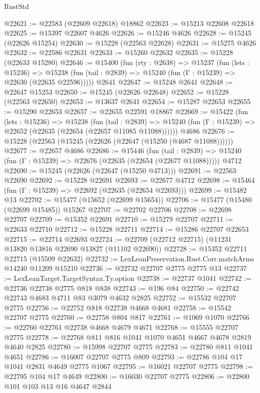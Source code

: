 \begin{lexlean}{RustStd}
\begin{coremodule}
@22621 := @22583 (@22609 @22618) @18862
@22623 := @15213 @22608 @22618
@22625 := @15397 @22607 @4626
@22626 := @15246 @4626
@22628 := @15245 (@22626 @15254)
@22630 := @15228 (@22563 @22628)
@22631 := @15275 @4626
@22632 := @22586 @22631
@22633 := @15260 @22632
@22635 := @15228 (@22633 @15280)
@22646 := @15400
    (fun (rty : @2638) =>
    @15237
      (fun (lets : @15236) =>
      @15238 (fun (tail : @2839) => @15240 (fun (Γ : @15239) => @22630 (@22635 @22596)))))
    @2641
@22647 := @15248 @2641
@22648 := @22647 @15253
@22650 := @15245 (@22626 @22648)
@22652 := @15228 (@22563 @22650)
@22653 := @13637 @2641
@22654 := @15287 @22653
@22655 := @15290 @22653
@22657 := @22655 @22591 @18867
@22669 := @15422
    (fun (lets : @15236) =>
    @15238
      (fun (tail : @2839) =>
      @15240 (fun (Γ : @15239) => @22652 (@22635 (@22654 (@22657 @11085 @11088))))))
    @4686
@22676 := @15228 (@22563 (@15245 (@22626 (@22647 (@15250 (@4687 @11088))))))
@22677 := @22657 @4686
@22686 := @15446
    (fun (tail : @2839) => @15240 (fun (Γ : @15239) => @22676 (@22635 (@22654 (@22677 @11088)))))
    @4712
@22690 := @15245 (@22626 (@22647 (@15250 @4713)))
@22691 := @22563 @22690
@22692 := @15228 @22691
@22693 := @22677 @4712
@22698 := @15464 (fun (Γ : @15239) => @22692 (@22635 (@22654 @22693)))
@22699 := @15482 @13
@22702 := @15477 (@15652 (@22699 @15654))
@22706 := @15477 (@15480 (@22699 @15485)) @15267
@22707 := @22702 @22706
@22708 := @22698 @22707
@22709 := @15352 @22691
@22710 := @15279 @22707
@22711 := @22633 @22710
@22712 := @15228 @22711
@22714 := @15286 @22707 @22653
@22715 := @22714 @22693
@22724 := @22709 (@22712 @22715) (@11231 @13820 @13816 @22690 @13827 (@11102 @22690))
@22728 := @15352 @22711 @22715 (@15509 @22632)
@22732 := LexLeanPreservation.Rust.Corr.matchArms @14240 @11209 @15210
@22736 := @22732 @22707 @2775 @2775 @13
@22737 := LexLeanTarget.TargetSyntax.Ty.option
@22738 := @22737 @1041
@22742 := @22736 @22738 @2775 @818 @838
@22743 := @196 @84
@22750 := @22742 @22743 @4683 @4711 @83 @3079 @4632 @2825
@22752 := @15532 @22707 @2775
@22756 := @22752 @818 @22738 @4668 @4681
@22758 := @15542 @22707 @2775
@22760 := @22758 @804 @817
@22761 := @1069 @1070
@22766 := @22760 @22761 @22738 @4668 @4679 @4671
@22768 := @15555 @22707 @2775
@22778 := @22768 @811 @816 @1041 @1070 @4651 @4667 @4678 @2819 @4640 @2825
@22780 := @15998 @22707 @2775
@22783 := @22780 @811 @1041 @4651
@22786 := @16007 @22707 @2775 @809
@22793 := @22786 @104 @17 @1041 @2831 @4649 @2775 @1067
@22795 := @16021 @22707 @2775
@22798 := @22795 @104 @17 @4649
@22800 := @16030 @22707 @2775
@22806 := @22800 @101 @103 @13 @16 @4647 @2844

\end{coremodule}
\end{lexlean}
